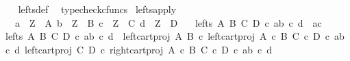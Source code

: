 \begin{isabellebody}
%
\isadelimproof
\ \ %
\endisadelimproof
%
\isatagproof
{}\isamarkupfalse%
\ lefts{\isacharunderscore}{\kern0pt}def\ \isamarkupfalse%
\ typecheck{\isacharunderscore}{\kern0pt}cfuncs%
\endisatagproof
{\isafoldproof}%
%
\isadelimproof
\isanewline
%
\endisadelimproof
\isanewline
{}\isamarkupfalse%
\ lefts{\isacharunderscore}{\kern0pt}apply{\isacharcolon}{\kern0pt}\isanewline
\ \ \ {\isachardoublequoteopen}a\ {\isacharcolon}{\kern0pt}\ Z\ {\isasymrightarrow}\ A{\isachardoublequoteclose}\ {\isachardoublequoteopen}b\ {\isacharcolon}{\kern0pt}\ Z\ {\isasymrightarrow}\ B{\isachardoublequoteclose}\ {\isachardoublequoteopen}c\ {\isacharcolon}{\kern0pt}\ Z\ {\isasymrightarrow}\ C{\isachardoublequoteclose}\ {\isachardoublequoteopen}d\ {\isacharcolon}{\kern0pt}\ Z\ {\isasymrightarrow}\ D{\isachardoublequoteclose}\isanewline
\ \ \ {\isachardoublequoteopen}lefts\ A\ B\ C\ D\ {\isasymcirc}\isactrlsub c\ {\isasymlangle}{\isasymlangle}a{\isacharcomma}{\kern0pt}b{\isasymrangle}{\isacharcomma}{\kern0pt}\ {\isasymlangle}c{\isacharcomma}{\kern0pt}\ d{\isasymrangle}{\isasymrangle}\ {\isacharequal}{\kern0pt}\ {\isasymlangle}a{\isacharcomma}{\kern0pt}c{\isasymrangle}{\isachardoublequoteclose}\isanewline
%
\isadelimproof
%
\endisadelimproof
%
\isatagproof
{}\isamarkupfalse%
\ {\isacharminus}{\kern0pt}\isanewline
\ \ \isamarkupfalse%
\ {\isachardoublequoteopen}lefts\ A\ B\ C\ D\ {\isasymcirc}\isactrlsub c\ {\isasymlangle}{\isasymlangle}a{\isacharcomma}{\kern0pt}b{\isasymrangle}{\isacharcomma}{\kern0pt}\ {\isasymlangle}c{\isacharcomma}{\kern0pt}\ d{\isasymrangle}{\isasymrangle}\ {\isacharequal}{\kern0pt}\ {\isasymlangle}left{\isacharunderscore}{\kern0pt}cart{\isacharunderscore}{\kern0pt}proj\ A\ B\ {\isasymcirc}\isactrlsub c\ left{\isacharunderscore}{\kern0pt}cart{\isacharunderscore}{\kern0pt}proj\ {\isacharparenleft}{\kern0pt}A\ {\isasymtimes}\isactrlsub c\ B{\isacharparenright}{\kern0pt}\ {\isacharparenleft}{\kern0pt}C\ {\isasymtimes}\isactrlsub c\ D{\isacharparenright}{\kern0pt}\ {\isasymcirc}\isactrlsub c\ {\isasymlangle}{\isasymlangle}a{\isacharcomma}{\kern0pt}b{\isasymrangle}{\isacharcomma}{\kern0pt}\ {\isasymlangle}c{\isacharcomma}{\kern0pt}\ d{\isasymrangle}{\isasymrangle}{\isacharcomma}{\kern0pt}\ left{\isacharunderscore}{\kern0pt}cart{\isacharunderscore}{\kern0pt}proj\ C\ D\ {\isasymcirc}\isactrlsub c\ right{\isacharunderscore}{\kern0pt}cart{\isacharunderscore}{\kern0pt}proj\ {\isacharparenleft}{\kern0pt}A\ {\isasymtimes}\isactrlsub c\ B{\isacharparenright}{\kern0pt}\ {\isacharparenleft}{\kern0pt}C\ {\isasymtimes}\isactrlsub c\ D{\isacharparenright}{\kern0pt}\ {\isasymcirc}\isactrlsub c\ {\isasymlangle}{\isasymlangle}a{\isacharcomma}{\kern0pt}b{\isasymrangle}{\isacharcomma}{\kern0pt}\ {\isasymlangle}c{\isacharcomma}{\kern0pt}\ d{\isasymrangle}{\isasymrangle}{\isasymrangle}{\isachardoublequoteclose}\isanewline

\end{isabellebody}
